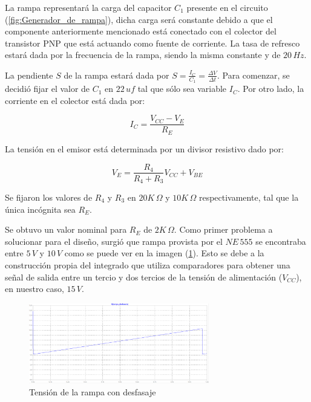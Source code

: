 La rampa representará la carga del capacitor $C_1$ presente en el circuito (\ref{fig:Generador_de_rampa}), dicha carga será constante debido a que el componente anteriormente mencionado está conectado con el colector del transistor PNP que está actuando como fuente de corriente. La tasa de refresco estará dada por la frecuencia de la rampa, siendo la misma constante y de $20\, Hz$. \par
La pendiente $S$ de la rampa estará dada por $S=\frac{I_C}{C_1}=\frac{\Delta V}{\Delta t}$.
Para comenzar, se decidió fijar el valor de $C_1$ en $22\,uf$ tal que sólo sea variable $I_C$. Por otro lado, la corriente en el colector está dada por:

\begin{equation}
I_C=\frac{V_{CC}-V_E}{R_E}
\end{equation}

La tensión en el emisor está determinada por un divisor resistivo dado por:

\begin{equation}
V_E=\frac{R_4}{R_4+R_3} V_{CC} + V_{BE}
\end{equation}
\par
Se fijaron los valores de $R_4$ y $R_3$ en $20K\,\Omega$ y $10K\,\Omega$ respectivamente, tal que la única incógnita sea $R_E$. \par
Se obtuvo un valor nominal para $R_E$ de $2K\,\Omega$. 
Como primer problema a solucionar para el diseño, surgió que rampa provista por el $NE\,555$ se encontraba entre $5\,V$ y $10\,V$ como se puede ver en la imagen (\ref{fig:Generador_de_rampa_desfasada_LTSpice}). Esto se debe a la construcción propia del integrado que utiliza comparadores para obtener una señal de salida entre un tercio y dos tercios de la tensión de alimentación ($V_{CC}$), en nuestro caso, $15\,V$.


\begin{figure}[H]
\centering
\includegraphics[width=0.7\textwidth]{Ejercicio8/Imagenes/Rampa_desfasada}
\caption{Tensión de la rampa con desfasaje}
\label{fig:Generador_de_rampa_desfasada_LTSpice}
\end{figure}

